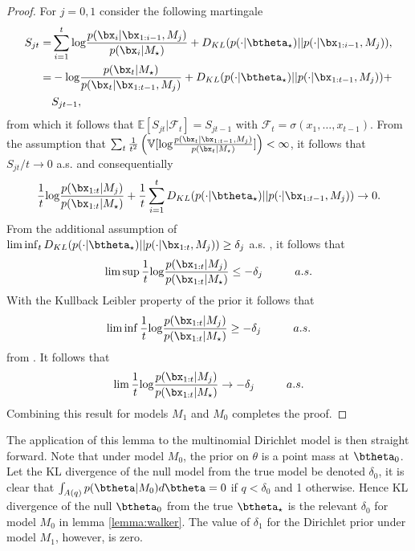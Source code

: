 \documentclass[11pt]{article}
\def\log{{\rm log}}
\begin{document}
\begin{proof}
  For $j=0,1$ consider the following martingale
  \begin{align*}
    \label{eq:walker_martingale}
    S_{jt} =& \sum_{i=1}^{t} \log \frac{p(\bx_i|\bx_{1:i-1},M_j)}{p(\bx_i|M_\star)} + D_{KL}(p(\cdot|\btheta_\star)||p(\cdot|\bx_{1:i-1}, M_j) ),\\
    =& -\log \frac{p(\bx_t|M_\star)}{p(\bx_t|\bx_{1:t-1},M_j)} + D_{KL}(p(\cdot|\btheta_\star)||p(\cdot|\bx_{1:t-1}, M_j) ) +\\
    &S_{jt-1},\\
  \end{align*}
  from which it follows that $\mathbb{E}[S_{jt}|\mathcal{F}_t] = S_{jt-1}$ with $\mathcal{F}_t = \sigma(x_1,\dots,x_{t-1})$.
From the assumption that  $\sum_t \frac{1}{t^2} \left( \mathbb{V}[\log \frac{p(\bx_t|\bx_{1:t-1},M_j)}{p(\bx_t|M_\star )}]\right) < \infty$, it follows that $S_{jt}/t \rightarrow 0$ a.s.
and consequentially
  \begin{align*}
    \frac{1}{t} \log \frac{p(\bx_{1:t}|M_j)}{p(\bx_{1:t}|M_\star)} + \frac{1}{t}\sum_{i=1}^t  D_{KL}(p(\cdot|\btheta_\star)||p(\cdot|\bx_{1:t-1}, M_j) )\rightarrow 0.
  \end{align*}
  From the additional assumption of $\lim \inf_t D_{KL}(p(\cdot|\btheta_\star)||p(\cdot|\bx_{1:t}, M_j) ) \geq \delta_j$ a.s.
, it follows that
  \begin{align*}
    \lim \sup   \frac{1}{t} \log \frac{p(\bx_{1:t}|M_j)}{p(\bx_{1:t}|M_\star)} \leq - \delta_j \hspace{1cm} a.s.
  \end{align*}
  With the Kullback Leibler property of the prior it follows that
  \begin{align*}
     \lim \inf   \frac{1}{t} \log \frac{p(\bx_{1:t}|M_j)}{p(\bx_{1:t}|M_\star)} \geq - \delta_j \hspace{1cm} a.s.
  \end{align*}
  from \cite{barron}.
It follows that
    \begin{align*}
     \lim   \frac{1}{t} \log \frac{p(\bx_{1:t}|M_j)}{p(\bx_{1:t}|M_\star)} \rightarrow - \delta_j \hspace{1cm} a.s.
    \end{align*}
    Combining this result for models $M_1$ and $M_0$ completes the proof.
\end{proof}

The application of this lemma to the multinomial Dirichlet model is then straight forward.
Note that under model $M_0$, the prior on $\theta$ is a point mass at $\btheta_0$.
Let the KL divergence of the null model from the true model be denoted $\delta_0$, it is clear that $\int_{A(q)} p(\btheta|M_0) d\btheta = 0$ if $q<\delta_0$ and 1 otherwise.
Hence KL divergence of the null $\btheta_0$ from the true $\btheta_\star$ is the relevant $\delta_0$ for model $M_0$ in lemma \ref{lemma:walker}.
The value of $\delta_1$ for the Dirichlet prior under model $M_1$, however, is zero.
\end{document}
